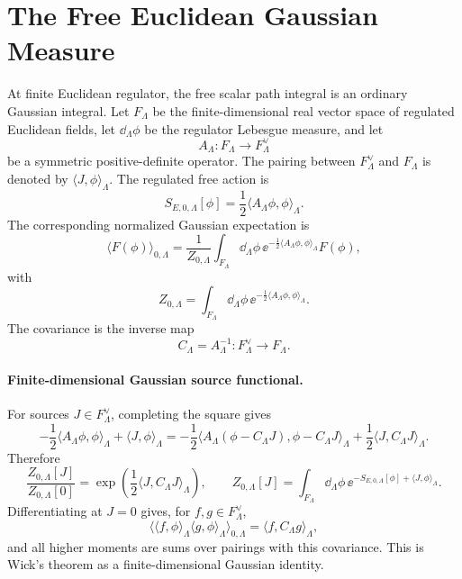 \section{The Free Euclidean Gaussian Measure}

\begin{definition}
\label{def:finite-regulator-euclidean-gaussian-datum}
At finite Euclidean regulator, the free scalar path integral is an ordinary
Gaussian integral.  Let \(F_\Lambda\) be the finite-dimensional real vector
space of regulated Euclidean fields, let \(\dd_\Lambda\phi\) be the regulator
Lebesgue measure, and let
\[
  A_\Lambda:F_\Lambda\longrightarrow F_\Lambda^\vee
\]
be a symmetric positive-definite operator.  The pairing between
\(F_\Lambda^\vee\) and \(F_\Lambda\) is denoted by
\(\langle J,\phi\rangle_\Lambda\).  The regulated free action is
\[
  S_{E,0,\Lambda}[\phi]
  =
  \frac12\langle A_\Lambda\phi,\phi\rangle_\Lambda .
\]
The corresponding normalized Gaussian expectation is
\[
  \langle F(\phi)\rangle_{0,\Lambda}
  =
  \frac{1}{Z_{0,\Lambda}}
  \int_{F_\Lambda}\dd_\Lambda\phi\,
  \ee^{-\frac12\langle A_\Lambda\phi,\phi\rangle_\Lambda}
  F(\phi),
\]
with
\[
  Z_{0,\Lambda}
  =
  \int_{F_\Lambda}\dd_\Lambda\phi\,
  \ee^{-\frac12\langle A_\Lambda\phi,\phi\rangle_\Lambda}.
\]
The covariance is the inverse map
\[
  C_\Lambda=A_\Lambda^{-1}:F_\Lambda^\vee\to F_\Lambda .
\]
\end{definition}

\paragraph{Finite-dimensional Gaussian source functional.}
For sources \(J\in F_\Lambda^\vee\), completing the square gives
\[
  -\frac12\langle A_\Lambda\phi,\phi\rangle_\Lambda
  +\langle J,\phi\rangle_\Lambda
  =
  -\frac12
  \langle A_\Lambda(\phi-C_\Lambda J),\phi-C_\Lambda J\rangle_\Lambda
  +
  \frac12\langle J,C_\Lambda J\rangle_\Lambda .
\]
Therefore
\[
  \frac{Z_{0,\Lambda}[J]}{Z_{0,\Lambda}[0]}
  =
  \exp\left(\frac12\langle J,C_\Lambda J\rangle_\Lambda\right),
  \qquad
  Z_{0,\Lambda}[J]
  =
  \int_{F_\Lambda}\dd_\Lambda\phi\,
  \ee^{-S_{E,0,\Lambda}[\phi]+\langle J,\phi\rangle_\Lambda}.
\]
Differentiating at \(J=0\) gives, for \(f,g\in F_\Lambda^\vee\),
\[
  \bigl\langle
  \langle f,\phi\rangle_\Lambda
  \langle g,\phi\rangle_\Lambda
  \bigr\rangle_{0,\Lambda}
  =
  \langle f,C_\Lambda g\rangle_\Lambda ,
\]
and all higher moments are sums over pairings with this covariance.  This is
Wick's theorem as a finite-dimensional Gaussian identity.

